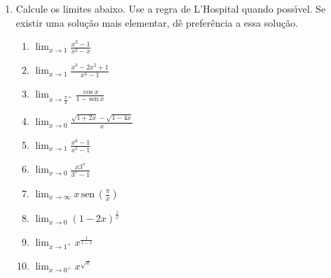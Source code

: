 \documentclass[a4paper,5pt]{amsbook}
\newcommand{\sen}{\,\mbox{sen}\,}
\newcommand{\ds}{\displaystyle}
\newcommand{\ra}{\rightarrow}
\begin{document}
\vspace{1cm}
\begin{enumerate}
    \vspace{0.5cm}
    \item Calcule os limites abaixo. Use a regra de L'Hospital quando
        poss\'{\i}vel. Se existir uma solu\c{c}\~ao mais elementar, d\^e
        prefer\^encia a essa solu\c{c}\~ao.

        \begin{enumerate}
            \item $\ds\lim_{x\ra1} \frac{x^2-1}{x^2-x}$
            \hspace{0.5cm}
            \item $\ds\lim_{x\ra1} \frac{x^3-2x^2+1}{x^3-1}$
            \hspace{0.5cm}
            \item $\ds\lim_{x\ra\frac{\pi}{2}^+} \frac{\cos{x}}{1-\sen{x}}$
            \hspace{0.5cm}
            \item $\ds\lim_{x\ra0} \frac{\sqrt{1+2x}-\sqrt{1-4x}}{x}$
            \hspace{0.5cm}
            \item $\ds\lim_{x\ra1} \frac{x^8-1}{x^5-1}$
            \hspace{0.5cm}
            \item $\ds\lim_{x\ra0} \frac{x3^x}{3^x-1}$
            \hspace{0.5cm}
            \item $\ds\lim_{x\ra\infty} x\sen{\left(\frac{\pi}{x}\right)}$
            \hspace{0.5cm}
            \item $\ds\lim_{x\ra0} {(1-2x)}^\frac{1}{x}$
            \hspace{0.5cm}
            \item $\ds\lim_{x\ra1^+}x^{\frac{1}{1-x}}$
            \hspace{0.5cm}
            \item $\ds\lim_{x\ra0^+} x^{\sqrt{x}}$
        \end{enumerate}

\end{enumerate}
\end{document}
